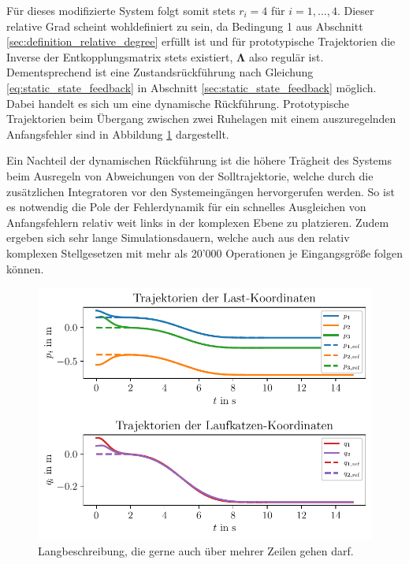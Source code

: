 Für dieses modifizierte System folgt somit stets $r_i = 4$ für $i = 1, ..., 4$. Dieser relative Grad scheint wohldefiniert zu sein, da Bedingung 1 aus Abschnitt \ref{sec:definition_relative_degree} erfüllt ist und für prototypische Trajektorien die Inverse der Entkopplungsmatrix stets existiert, $\boldsymbol{\Lambda}$ also regulär ist. Dementsprechend ist eine Zustandsrückführung nach Gleichung \eqref{eq:static_state_feedback} in Abschnitt \ref{sec:static_state_feedback} möglich. Dabei handelt es sich um eine dynamische Rückführung. Prototypische Trajektorien beim Übergang zwischen zwei Ruhelagen mit einem auszuregelnden Anfangsfehler sind in Abbildung \ref{fig_dyn_controller_initial_error} dargestellt.

Ein Nachteil der dynamischen Rückführung ist die höhere Trägheit des Systems beim Ausregeln von Abweichungen von der Solltrajektorie, welche durch die zusätzlichen Integratoren vor den Systemeingängen hervorgerufen werden. So ist es notwendig die Pole der Fehlerdynamik für ein schnelles Ausgleichen von Anfangsfehlern relativ weit links in der komplexen Ebene zu platzieren. Zudem ergeben sich sehr lange Simulationsdauern, welche auch aus den relativ komplexen Stellgesetzen mit mehr als 20'000 Operationen je Eingangsgröße folgen können. 

\begin{figure}[ht]
	\begin{center}
		\includegraphics[scale=1]{Pictures/dyn_controller_initial_error}
	\end{center}
	\caption[Kurzbeschreibung für Abbildungsverzeichnis]
	{Langbeschreibung, die gerne auch über mehrer Zeilen gehen darf.}
	\label{fig_dyn_controller_initial_error}
\end{figure}


